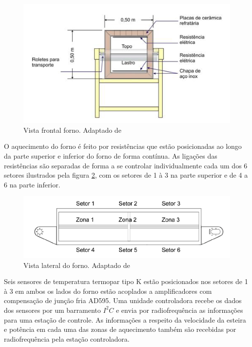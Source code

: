 \begin{figure}[H]
\centering
\includegraphics[width=\textwidth]{Figuras/forno_frontal}
\caption{Vista frontal forno. Adaptado de \citet{arthur}}
\label{fig:forno_frontal}
\end{figure}

O aquecimento do forno é feito por resistências que estão posicionadas ao longo da parte superior e inferior do forno de forma contínua. As ligações das resistências são separadas de forma a se controlar individualmente cada um dos 6 setores ilustrados pela figura \ref{fig:forno_esquema_lateral}, com os setores de 1 à 3 na parte superior e de 4 a 6 na parte inferior. 

\begin{figure}[H]
\centering
\includegraphics[width=\textwidth]{Figuras/forno_esquema_lateral}
\caption{Vista lateral do forno. Adaptado de \citet{arthur}}
\label{fig:forno_esquema_lateral}
\end{figure}

Seis sensores de temperatura termopar tipo K estão posicionados nos setores de 1 à 3 em ambos os lados do forno estão acoplados a amplificadores com compensação de junção fria AD595. Uma unidade controladora recebe os dados dos sensores por um barramento $I^2C$ e envia por radiofrequência as informações para uma estação de controle. As informações a respeito da velocidade da esteira e potência em cada uma das zonas de aquecimento também são recebidas por radiofrequência pela estação controladora.

